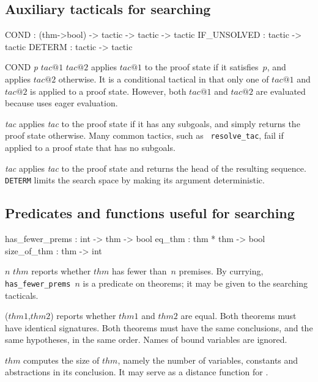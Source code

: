 \subsection{Auxiliary tacticals for searching}
\begin{ttbox} 
COND        : (thm->bool) -> tactic -> tactic -> tactic
IF_UNSOLVED : tactic -> tactic
DETERM      : tactic -> tactic
\end{ttbox}
\begin{ttdescription}
\item[COND {\it p} $tac@1$ $tac@2$] 
applies $tac@1$ to the proof state if it satisfies~$p$, and applies $tac@2$
otherwise.  It is a conditional tactical in that only one of $tac@1$ and
$tac@2$ is applied to a proof state.  However, both $tac@1$ and $tac@2$ are
evaluated because \ML{} uses eager evaluation.

\item[\ttindexbold{IF_UNSOLVED} {\it tac}] 
applies {\it tac\/} to the proof state if it has any subgoals, and simply
returns the proof state otherwise.  Many common tactics, such as {\tt
resolve_tac}, fail if applied to a proof state that has no subgoals.

\item[\ttindexbold{DETERM} {\it tac}] 
applies {\it tac\/} to the proof state and returns the head of the
resulting sequence.  {\tt DETERM} limits the search space by making its
argument deterministic.
\end{ttdescription}


\subsection{Predicates and functions useful for searching}
\begin{ttbox} 
has_fewer_prems : int -> thm -> bool
eq_thm          : thm * thm -> bool
size_of_thm     : thm -> int
\end{ttbox}
\begin{ttdescription}
\item[\ttindexbold{has_fewer_prems} $n$ $thm$] 
reports whether $thm$ has fewer than~$n$ premises.  By currying,
\hbox{\tt has_fewer_prems $n$} is a predicate on theorems; it may 
be given to the searching tacticals.

\item[\ttindexbold{eq_thm}($thm1$,$thm2$)] 
reports whether $thm1$ and $thm2$ are equal.  Both theorems must have
identical signatures.  Both theorems must have the same conclusions, and
the same hypotheses, in the same order.  Names of bound variables are
ignored.

\item[\ttindexbold{size_of_thm} $thm$] 
computes the size of $thm$, namely the number of variables, constants and
abstractions in its conclusion.  It may serve as a distance function for 
. 
\end{ttdescription}

